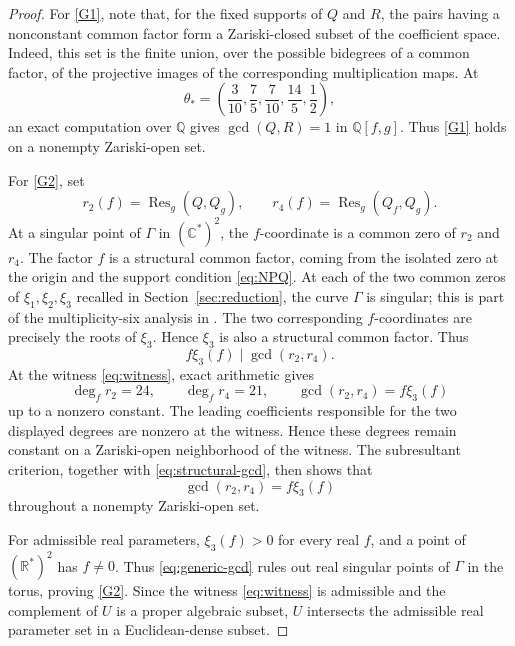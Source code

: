 \documentclass[10pt,reqno]{amsart}
\numberwithin{equation}{section}
\theoremstyle{plain}
\theoremstyle{remark}
\newcommand{\R}{\mathbb{R}}
\newcommand{\C}{\mathbb{C}}
\newcommand{\Qfield}{\mathbb{Q}}
\newcommand{\Res}{\operatorname{Res}}
\begin{document}
\begin{proof}
For \ref{G1}, note that, for the fixed supports of $Q$ and $R$, the pairs
having a nonconstant common factor form a Zariski-closed subset of the
coefficient space.  Indeed, this set is the finite union, over the possible
bidegrees of a common factor, of the projective images of the corresponding
multiplication maps.  At
\begin{equation}\label{eq:witness}
  \theta_*
  =\left(\frac{3}{10},\frac{7}{5},\frac{7}{10},
          \frac{14}{5},\frac12\right),
\end{equation}
an exact computation over $\Qfield$ gives $\gcd(Q,R)=1$ in
$\Qfield[f,g]$.  Thus \ref{G1} holds on a nonempty Zariski-open set.

For \ref{G2}, set
\begin{equation}\label{eq:r2r4}
  r_2(f)=\Res_g(Q,Q_g),
  \qquad
  r_4(f)=\Res_g(Q_f,Q_g).
\end{equation}
At a singular point of $\Gamma$ in $(\C^*)^2$, the $f$-coordinate is a
common zero of $r_2$ and $r_4$.  The factor $f$ is a structural common
factor, coming from the isolated zero at the origin and the support
condition \eqref{eq:NPQ}.  At each of the two common zeros of $\xi_1,\xi_2,\xi_3$ recalled in
Section~\ref{sec:reduction}, the curve $\Gamma$ is singular; this is part
of the multiplicity-six analysis in \cite{GNS}.  The two corresponding
$f$-coordinates are precisely the roots of $\xi_3$.  Hence $\xi_3$ is
also a structural common factor.  Thus
\begin{equation}\label{eq:structural-gcd}
  f\xi_3(f)\mid\gcd(r_2,r_4).
\end{equation}
At the witness \eqref{eq:witness}, exact arithmetic gives
\begin{equation}\label{eq:witness-degrees}
  \deg_f r_2=24,
  \qquad
  \deg_f r_4=21,
  \qquad
  \gcd(r_2,r_4)=f\xi_3(f)
\end{equation}
up to a nonzero constant.  The leading coefficients responsible for the
two displayed degrees are nonzero at the witness.  Hence these degrees
remain constant on a Zariski-open neighborhood of the witness.
The subresultant criterion, together with
\eqref{eq:structural-gcd}, then shows that
\begin{equation}\label{eq:generic-gcd}
  \gcd(r_2,r_4)=f\xi_3(f)
\end{equation}
throughout a nonempty Zariski-open set.

For admissible real parameters, $\xi_3(f)>0$ for every real $f$, and a
point of $(\R^*)^2$ has $f\neq0$.  Thus \eqref{eq:generic-gcd} rules out
real singular points of $\Gamma$ in the torus, proving \ref{G2}.  Since
the witness \eqref{eq:witness} is admissible and the complement of $U$ is
a proper algebraic subset, $U$ intersects the admissible real parameter
set in a Euclidean-dense subset.
\end{proof}
\end{document}
